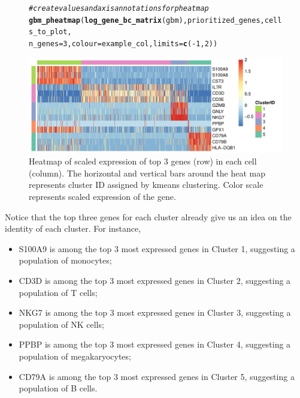 \documentclass[10pt,oneside]{article}\usepackage[]{graphicx}\usepackage[]{color}
\makeatletter
\def\maxwidth{ %
  \ifdim\Gin@nat@width>\linewidth
    \linewidth
  \else
    \Gin@nat@width
  \fi
}
\newcommand{\hlnum}[1]{\textcolor[rgb]{0.686,0.059,0.569}{#1}}%
\newcommand{\hlcom}[1]{\textcolor[rgb]{0.678,0.584,0.686}{\textit{#1}}}%
\newcommand{\hlopt}[1]{\textcolor[rgb]{0,0,0}{#1}}%
\newcommand{\hlstd}[1]{\textcolor[rgb]{0.345,0.345,0.345}{#1}}%
\newcommand{\hlkwc}[1]{\textcolor[rgb]{0.333,0.667,0.333}{#1}}%
\newcommand{\hlkwd}[1]{\textcolor[rgb]{0.737,0.353,0.396}{\textbf{#1}}}%
\newenvironment{kframe}{%
 \def\at@end@of@kframe{}%
 \ifinner\ifhmode%
  \def\at@end@of@kframe{\end{minipage}}%
  \begin{minipage}{\columnwidth}%
 \fi\fi%
 \def\FrameCommand##1{\hskip\@totalleftmargin \hskip-\fboxsep
 \colorbox{shadecolor}{##1}\hskip-\fboxsep
     \hskip-\linewidth \hskip-\@totalleftmargin \hskip\columnwidth}%
 \MakeFramed {\advance\hsize-\width
   \@totalleftmargin\z@ \linewidth\hsize
   \@setminipage}}%
 {\par\unskip\endMakeFramed%
 \at@end@of@kframe}
\newenvironment{knitrout}{}{} %
\makeatother
\begin{document}
\begin{figure}[htbp]
\begin{center}
\begin{knitrout}
\color{fgcolor}\begin{kframe}
\begin{alltt}
\hlcom{# create values and axis annotations for pheatmap}
\hlkwd{gbm_pheatmap}\hlstd{(}\hlkwd{log_gene_bc_matrix}\hlstd{(gbm), prioritized_genes, cells_to_plot,}
             \hlkwc{n_genes}\hlstd{=}\hlnum{3}\hlstd{,} \hlkwc{colour}\hlstd{=example_col,} \hlkwc{limits}\hlstd{=}\hlkwd{c}\hlstd{(}\hlopt{-}\hlnum{1}\hlstd{,}\hlnum{2}\hlstd{))}
\end{alltt}
\end{kframe}

{\centering \includegraphics[width=\maxwidth]{figure/heatmap-1} 

}



\end{knitrout}
\caption{Heatmap of scaled expression of top 3 genes (row) in each cell (column). The horizontal and vertical bars around the heat map represents cluster ID assigned by kmeans clustering. Color scale represents scaled expression of the gene.}
\label{fig:heatmap}
\end{center}
\end{figure}

\newpage
Notice that the top three genes for each cluster already give us an idea on the identity of each cluster. For instance,
\begin{itemize}
\item
S100A9 is among the top 3 most expressed genes in Cluster 1, suggesting a population of monocytes;
\item
CD3D is among the top 3 most expressed genes in Cluster 2, suggesting a population of T cells;
\item
NKG7 is among the top 3 most expressed genes in Cluster 3, suggesting a population of NK cells;
\item
PPBP is among the top 3 most expressed genes in Cluster 4, suggesting a population of megakaryocytes;
\item
CD79A is among the top 3 most expressed genes in Cluster 5, suggesting a population of B cells.
\end{itemize}
\end{document}
